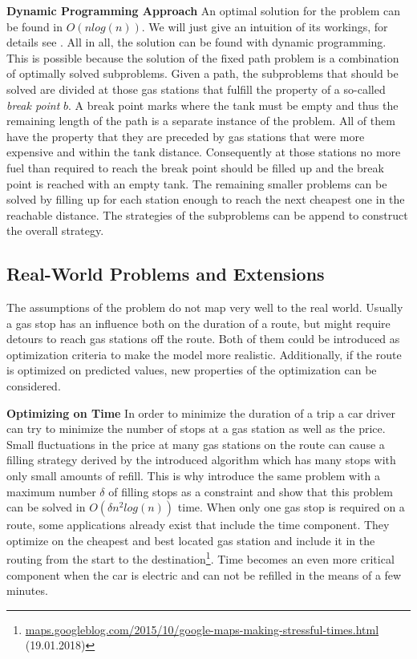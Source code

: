 \documentclass[%
a4paper,
DIV12,
2.5headlines,
bigheadings,
titlepage,
openbib,
]{scrartcl}
\begin{document}
\textbf{Dynamic Programming Approach}
An optimal solution for the problem can be found in $O(n log(n))$.
We will just give an intuition of its workings, for details see \cite{khuller2007fill}. 
All in all, the solution can be found with dynamic programming.
This is possible because the solution of the fixed path problem is a combination of optimally solved subproblems.
Given a path, the subproblems that should be solved are divided at those gas stations that fulfill the property of a so-called \textit{break point} $b$.
A break point marks where the tank must be empty and thus the remaining length of the path is a separate instance of the problem.
All of them have the property that they are preceded by gas stations that were more expensive and within the tank distance.
Consequently at those stations no more fuel than required to reach the break point should be filled up and the break point is reached with an empty tank.
The remaining smaller problems can be solved by filling up for each station enough to reach the next cheapest one in the reachable distance.
The strategies of the subproblems can be append to construct the overall strategy.

\subsection{Real-World Problems and Extensions}
The assumptions of the problem do not map very well to the real world.
Usually a gas stop has an influence both on the duration of a route, but might require detours to reach gas stations off the route. 
Both of them could be introduced as optimization criteria to make the model more realistic.
Additionally, if the route is optimized on predicted values, new properties of the optimization can be considered.

\textbf{Optimizing on Time} 
In order to minimize the duration of a trip a car driver can try to minimize the number of stops at a gas station as well as the price.
Small fluctuations in the price at many gas stations on the route can cause a filling strategy derived by the introduced algorithm which has many stops with only small amounts of refill.
This is why \citet{khuller2007fill} introduce the same problem with a maximum number $\delta$ of filling stops as a constraint and show that this problem can be solved in $O(\delta n^2 log(n))$ time.
When only one gas stop is required on a route, some applications already exist that include the time component.
They optimize on the cheapest and best located gas station and include it in the routing from the start to the destination\footnote{\url{maps.googleblog.com/2015/10/google-maps-making-stressful-times.html} (19.01.2018)}.
Time becomes an even more critical component when the car is electric and can not be refilled in the means of a few minutes. 
\end{document}
